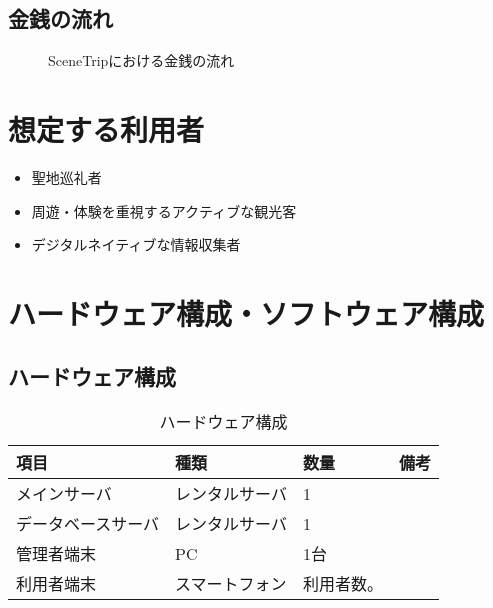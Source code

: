 \documentclass{docs}
\begin{document}
\subsection{金銭の流れ}
\begin{figure}[H]
    \centering
    \caption{SceneTripにおける金銭の流れ}
    \label{fig:money}
\end{figure}


\section{想定する利用者}
\begin{itemize}
    \item 聖地巡礼者
    \item 周遊・体験を重視するアクティブな観光客
    \item デジタルネイティブな情報収集者
\end{itemize}

\section{ハードウェア構成・ソフトウェア構成}
\subsection{ハードウェア構成}
\begin{table}[H]
    \centering
    \caption{ハードウェア構成}
    \label{tab:hardware}
    \begin{tabularx}{0.9\textwidth}{|l|X|X|X|}
        \hline
        \textbf{項目} & \textbf{種類} & \textbf{数量} & \textbf{備考} \\ \hline
        メインサーバ & レンタルサーバ & 1 & \\ \hline
        データベースサーバ & レンタルサーバ & 1 & \\ \hline
        管理者端末 & PC & 1台 & \\ \hline
        利用者端末 & スマートフォン & 利用者数。 & \\ \hline
    \end{tabularx}
\end{table}
\end{document}
